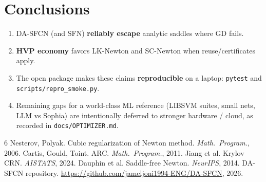 \documentclass[11pt,a4paper]{article}
\begin{document}
\section{Conclusions}
\begin{enumerate}
\item DA-SFCN (and SFN) \textbf{reliably escape} analytic saddles where GD fails.
\item \textbf{HVP economy} favors LK-Newton and SC-Newton when reuse/certificates apply.
\item The open package makes these claims \textbf{reproducible} on a laptop:
  \texttt{pytest} and \texttt{scripts/repro\_smoke.py}.
\item Remaining gaps for a world-class ML reference (LIBSVM suites, small nets,
  LLM vs Sophia) are intentionally deferred to stronger hardware / cloud, as
  recorded in \texttt{docs/OPTIMIZER.md}.
\end{enumerate}

\begin{thebibliography}{6}
 Nesterov, Polyak. Cubic regularization of Newton method. \textit{Math.\ Program.}, 2006.
 Cartis, Gould, Toint. ARC. \textit{Math.\ Program.}, 2011.
 Jiang et al. Krylov CRN. \textit{AISTATS}, 2024.
 Dauphin et al. Saddle-free Newton. \textit{NeurIPS}, 2014.
 DA-SFCN repository. \url{https://github.com/jameljoni1994-ENG/DA-SFCN}, 2026.
\end{thebibliography}
\end{document}
